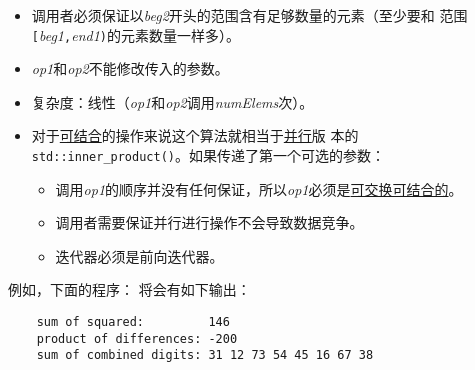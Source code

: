 \begin{itemize}
    \item 调用者必须保证以\emph{beg2}开头的范围含有足够数量的元素（至少要和
    范围\texttt{[}\emph{beg1}\texttt{,}\emph{end1}\texttt{)}的元素数量一样多）。
    \item \emph{op1}和\emph{op2}不能修改传入的参数。
    \item 复杂度：线性（\emph{op1}和\emph{op2}调用\emph{numElems}次）。
    \item 对于\hyperref[ch22.6.1.1]{可结合}的操作来说这个算法就相当于\hyperref[ch22]{并行}版
    本的\texttt{std::inner\_product()}。如果传递了第一个可选的参数：
    \begin{itemize}
        \item 调用\emph{op1}的顺序并没有任何保证，所以\emph{op1}必须是\hyperref[ch22.6.1.1]{可交换可结合的}。
        \item 调用者需要保证并行进行操作不会导致数据竞争。
        \item 迭代器必须是前向迭代器。
    \end{itemize}
\end{itemize}
例如，下面的程序：
将会有如下输出：
\begin{lstlisting}
    sum of squared:         146
    product of differences: -200
    sum of combined digits: 31 12 73 54 45 16 67 38
\end{lstlisting}

